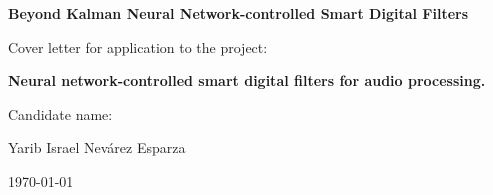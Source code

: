 
\begin{center}

\textbf{\Large Beyond Kalman Neural Network-controlled Smart Digital Filters}
\vspace{40mm}

Cover letter for application to the project:

\textbf{Neural network-controlled smart digital filters for audio processing.}

\vspace{40mm}

Candidate name:

Yarib Israel Nev\'arez Esparza
\vspace{20mm}

\today

\end{center}


\pagebreak